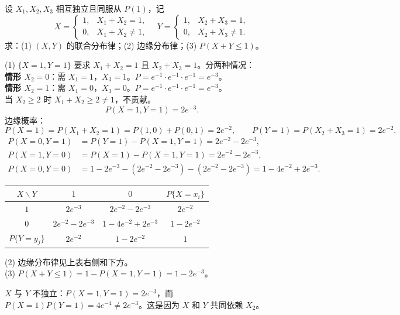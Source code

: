 \documentclass[lang=cn,11pt]{elegantbook}
\begin{document}
\begin{exercise}[泊松变量的复合函数] \label{exer:3-d4}
设 $X_1,X_2,X_3$ 相互独立且同服从 $P(1)$，记
\[
X = \begin{cases} 1, & X_1+X_2=1, \\ 0, & X_1+X_2\neq 1, \end{cases} \quad Y = \begin{cases} 1, & X_2+X_3=1, \\ 0, & X_2+X_3\neq 1. \end{cases}
\]
求：(1) $(X,Y)$ 的联合分布律；(2) 边缘分布律；(3) $P(X+Y \leqslant 1)$。
\end{exercise}
\begin{solution}
(1) $\{X=1,Y=1\}$ 要求 $X_1+X_2=1$ 且 $X_2+X_3=1$。分两种情况：\\
\textbf{情形 $X_2=0$}：需 $X_1=1$，$X_3=1$。$P = e^{-1}\cdot e^{-1}\cdot e^{-1} = e^{-3}$。\\
\textbf{情形 $X_2=1$}：需 $X_1=0$，$X_3=0$。$P = e^{-1}\cdot e^{-1}\cdot e^{-1} = e^{-3}$。\\
当 $X_2 \geqslant 2$ 时 $X_1+X_2 \geqslant 2 \neq 1$，不贡献。
\[
P(X=1,Y=1) = 2e^{-3}.
\]
边缘概率：
\[
P(X=1) = P(X_1+X_2=1) = P(1,0)+P(0,1) = 2e^{-2}, \qquad P(Y=1) = P(X_2+X_3=1) = 2e^{-2}.
\]
\begin{align*}
P(X=0,Y=1) &= P(Y=1)-P(X=1,Y=1) = 2e^{-2}-2e^{-3}, \\
P(X=1,Y=0) &= P(X=1)-P(X=1,Y=1) = 2e^{-2}-2e^{-3}, \\
P(X=0,Y=0) &= 1-2e^{-3}-(2e^{-2}-2e^{-3})-(2e^{-2}-2e^{-3}) = 1-4e^{-2}+2e^{-3}.
\end{align*}
\begin{center}
\begin{tabular}{c|cc|c}
\toprule
$X \backslash Y$ & $1$ & $0$ & $P\{X=x_i\}$ \\
\midrule
$1$ & $2e^{-3}$ & $2e^{-2}-2e^{-3}$ & $2e^{-2}$ \\[4pt]
$0$ & $2e^{-2}-2e^{-3}$ & $1-4e^{-2}+2e^{-3}$ & $1-2e^{-2}$ \\
\midrule
$P\{Y=y_j\}$ & $2e^{-2}$ & $1-2e^{-2}$ & $1$ \\
\bottomrule
\end{tabular}
\end{center}
(2) 边缘分布律见上表右侧和下方。\\
(3) $P(X+Y \leqslant 1) = 1-P(X=1,Y=1) = 1-2e^{-3}$。
\begin{note}
$X$ 与 $Y$ 不独立：$P(X=1,Y=1)=2e^{-3}$，而 $P(X=1)P(Y=1)=4e^{-4} \neq 2e^{-3}$。这是因为 $X$ 和 $Y$ 共同依赖 $X_2$。
\end{note}
\end{solution}
\end{document}
